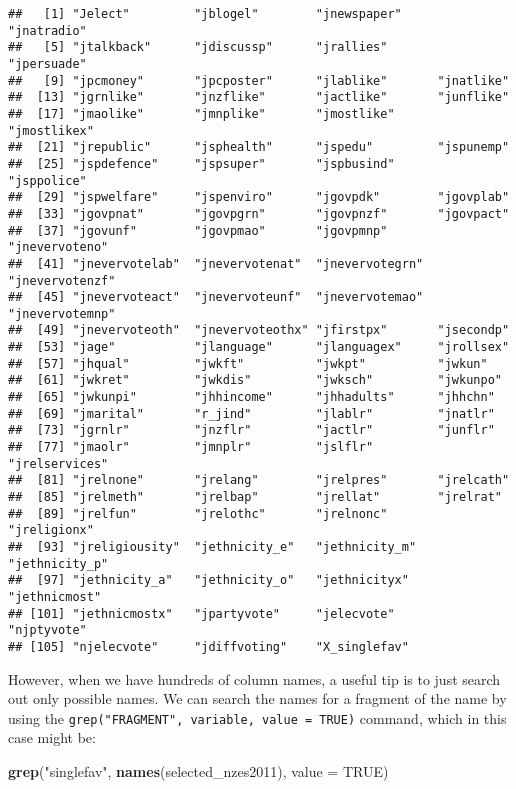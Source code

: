\documentclass[]{article}
\newenvironment{Shaded}{\begin{snugshade}}{\end{snugshade}}
\newcommand{\KeywordTok}[1]{\textcolor[rgb]{0.13,0.29,0.53}{\textbf{#1}}}
\newcommand{\DataTypeTok}[1]{\textcolor[rgb]{0.13,0.29,0.53}{#1}}
\newcommand{\StringTok}[1]{\textcolor[rgb]{0.31,0.60,0.02}{#1}}
\newcommand{\OtherTok}[1]{\textcolor[rgb]{0.56,0.35,0.01}{#1}}
\newcommand{\NormalTok}[1]{#1}
\begin{document}
\begin{verbatim}
##   [1] "Jelect"         "jblogel"        "jnewspaper"     "jnatradio"     
##   [5] "jtalkback"      "jdiscussp"      "jrallies"       "jpersuade"     
##   [9] "jpcmoney"       "jpcposter"      "jlablike"       "jnatlike"      
##  [13] "jgrnlike"       "jnzflike"       "jactlike"       "junflike"      
##  [17] "jmaolike"       "jmnplike"       "jmostlike"      "jmostlikex"    
##  [21] "jrepublic"      "jsphealth"      "jspedu"         "jspunemp"      
##  [25] "jspdefence"     "jspsuper"       "jspbusind"      "jsppolice"     
##  [29] "jspwelfare"     "jspenviro"      "jgovpdk"        "jgovplab"      
##  [33] "jgovpnat"       "jgovpgrn"       "jgovpnzf"       "jgovpact"      
##  [37] "jgovunf"        "jgovpmao"       "jgovpmnp"       "jnevervoteno"  
##  [41] "jnevervotelab"  "jnevervotenat"  "jnevervotegrn"  "jnevervotenzf" 
##  [45] "jnevervoteact"  "jnevervoteunf"  "jnevervotemao"  "jnevervotemnp" 
##  [49] "jnevervoteoth"  "jnevervoteothx" "jfirstpx"       "jsecondp"      
##  [53] "jage"           "jlanguage"      "jlanguagex"     "jrollsex"      
##  [57] "jhqual"         "jwkft"          "jwkpt"          "jwkun"         
##  [61] "jwkret"         "jwkdis"         "jwksch"         "jwkunpo"       
##  [65] "jwkunpi"        "jhhincome"      "jhhadults"      "jhhchn"        
##  [69] "jmarital"       "r_jind"         "jlablr"         "jnatlr"        
##  [73] "jgrnlr"         "jnzflr"         "jactlr"         "junflr"        
##  [77] "jmaolr"         "jmnplr"         "jslflr"         "jrelservices"  
##  [81] "jrelnone"       "jrelang"        "jrelpres"       "jrelcath"      
##  [85] "jrelmeth"       "jrelbap"        "jrellat"        "jrelrat"       
##  [89] "jrelfun"        "jrelothc"       "jrelnonc"       "jreligionx"    
##  [93] "jreligiousity"  "jethnicity_e"   "jethnicity_m"   "jethnicity_p"  
##  [97] "jethnicity_a"   "jethnicity_o"   "jethnicityx"    "jethnicmost"   
## [101] "jethnicmostx"   "jpartyvote"     "jelecvote"      "njptyvote"     
## [105] "njelecvote"     "jdiffvoting"    "X_singlefav"
\end{verbatim}

However, when we have hundreds of column names, a useful tip is to just
search out only possible names. We can search the names for a fragment
of the name by using the
\texttt{grep("FRAGMENT",\ variable,\ value\ =\ TRUE)} command, which in
this case might be:

\begin{Shaded}
\begin{Highlighting}[]
\KeywordTok{grep}\NormalTok{(}\StringTok{"singlefav"}\NormalTok{, }\KeywordTok{names}\NormalTok{(selected_nzes2011), }\DataTypeTok{value =} \OtherTok{TRUE}\NormalTok{)}
\end{Highlighting}
\end{Shaded}
\end{document}
